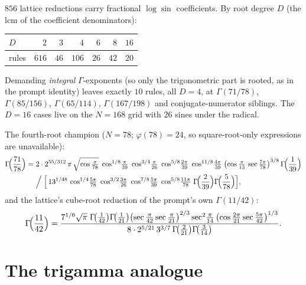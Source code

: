 \begin{result}\label{gamma:res:census}
$856$ lattice reductions carry fractional $\log\sin$ coefficients. By root degree $D$
(the lcm of the coefficient denominators):
\begin{center}
\begin{tabular}{l rrrrrr}
\toprule
$D$ & $2$ & $3$ & $4$ & $6$ & $8$ & $16$\\
\midrule
rules & $616$ & $46$ & $106$ & $26$ & $42$ & $20$\\
\bottomrule
\end{tabular}
\end{center}
Demanding \emph{integral} $\Gamma$-exponents (so only the trigonometric part is rooted, as
in the prompt identity) leaves exactly $10$ rules, all $D=4$, at $\Gamma(71/78)$,
$\Gamma(85/156)$, $\Gamma(65/114)$, $\Gamma(167/198)$ and conjugate-numerator siblings.
The $D=16$ cases live on the $N=168$ grid with $26$ sines under the radical.
\end{result}

\begin{result}[showpieces]\label{gamma:res:showpieces}
The fourth-root champion ($N=78$; $\varphi(78)=24$, so square-root-only expressions are unavailable):
\begin{align*}
\Gamma\!\Bigl(\frac{71}{78}\Bigr)
={}&2\cdot2^{55/312}\,\pi\,\sqrt{\cos\tfrac{\pi}{78}}\;
\cos^{1/8}\!\tfrac{\pi}{39}\;\cos^{3/4}\!\tfrac{\pi}{26}\;
\cos^{5/8}\!\tfrac{2\pi}{39}\;\cos^{11/8}\!\tfrac{4\pi}{39}\;
\bigl(\cos\tfrac{\pi}{13}\,\sec\tfrac{7\pi}{78}\bigr)^{3/8}\,
\Gamma\!\Bigl(\frac{1}{39}\Bigr)\\
&\Big/\;\Bigl[\,13^{1/48}\,
\cos^{1/4}\!\tfrac{5\pi}{78}\;\cos^{3/2}\!\tfrac{3\pi}{26}\;
\cos^{7/8}\!\tfrac{5\pi}{39}\;\cos^{5/8}\!\tfrac{11\pi}{78}\;
\Gamma\!\Bigl(\frac{2}{39}\Bigr)\Gamma\!\Bigl(\frac{5}{78}\Bigr)\Bigr],
\end{align*}
and the lattice's cube-root reduction of the prompt's own $\Gamma(11/42)$:
\[
\Gamma\!\Bigl(\frac{11}{42}\Bigr)
=\frac{7^{1/6}\sqrt{\pi}\;\Gamma\!\bigl(\tfrac1{42}\bigr)\Gamma\!\bigl(\tfrac1{21}\bigr)
\bigl(\sec\tfrac{\pi}{42}\sec\tfrac{\pi}{21}\bigr)^{2/3}
\sec^2\!\tfrac{\pi}{14}\,\bigl(\cos\tfrac{2\pi}{21}\sec\tfrac{5\pi}{42}\bigr)^{1/3}}
{8\cdot2^{5/21}\,3^{3/7}\,\Gamma\!\bigl(\tfrac2{21}\bigr)\Gamma\!\bigl(\tfrac3{14}\bigr)} .
\]
\end{result}

\section{The trigamma analogue}\label{gamma:sec:trigamma}

